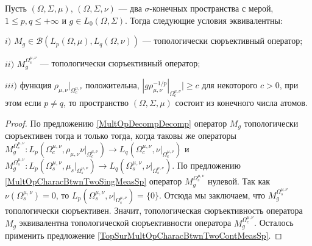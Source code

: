 \begin{proposition}\label{TopSurMultOpCharacBtwnTwoMeasSp} Пусть $(\Omega,\Sigma,\mu)$, $(\Omega,\Sigma,\nu)$ --- два $\sigma$-конечных пространства с мерой, $1\leq p,q\leq +\infty$ и $g\in L_0(\Omega,\Sigma)$. Тогда следующие условия эквивалентны:

$i)$ $M_g\in\mathcal{B}(L_p(\Omega,\mu), L_q(\Omega,\nu))$ --- топологически сюръективный оператор;

$ii)$ $M_g^{\Omega_c^{\mu,\nu}}$ --- топологически сюръективный оператор;

$iii)$ функция $\rho_{\mu,\nu}|_{\Omega_c^{\mu,\nu}}$ положительна, $|g \rho_{\mu,\nu}^{-1/p}|_{\Omega_c^{\mu,\nu}}|\geq c$ для некоторого $c>0$, при этом если $p\neq q$, то пространство $(\Omega,\Sigma,\mu)$ состоит из конечного числа атомов.
\end{proposition}
\begin{proof} По предложению \ref{MultOpDecompDecomp} оператор $M_g$ топологически сюръективен тогда и только тогда, когда таковы же операторы $M_g^{\Omega_c^{\mu,\nu}}:L_p(\Omega_c^{\mu,\nu},\rho_{\mu,\nu} \nu|_{\Omega_c^{\mu,\nu}})\to L_q(\Omega_c^{\mu,\nu},\nu|_{\Omega_c^{\mu,\nu}})$ и $M_g^{\Omega_s^{\mu,\nu}}:L_p(\Omega_s^{\mu,\nu},\mu_s|_{\Omega_s^{\mu,\nu}})\to L_q(\Omega_s^{\mu,\nu},\nu|_{\Omega_s^{\mu,\nu}})$. По предложению \ref{MultOpCharacBtwnTwoSingMeasSp} оператор $M_g^{\Omega_s^{\mu,\nu}}$ нулевой. Так как $\nu(\Omega_s^{\mu,\nu})=0$, то $L_p(\Omega_s^{\mu,\nu},\nu|_{\Omega_s^{\mu,\nu}})=\{0\}$. Отсюда мы заключаем, что $M_g^{\Omega_s^{\mu,\nu}}$ топологически сюръективен. Значит, топологическая сюръективность оператора $M_g$ эквивалентна топологической сюръективности оператора $M_g^{\Omega_c^{\mu,\nu}}$. Осталось применить предложение \ref{TopSurMultOpCharacBtwnTwoContMeasSp}.
\end{proof}

